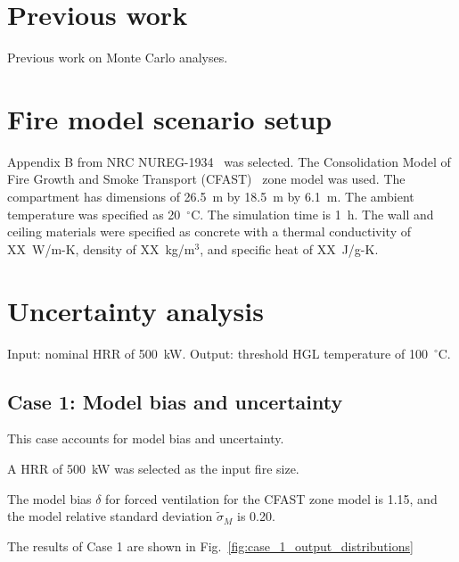\documentclass[12pt]{article}
\begin{document}
\section{Previous work}
\label{sec:previous_work}

Previous work on Monte Carlo analyses.


\section{Fire model scenario setup}
\label{sec:fire_model_scenario_setup}

Appendix B from NRC NUREG-1934~\cite{NUREG_1934} was selected. The Consolidation Model of Fire Growth and Smoke Transport (CFAST)~\cite{CFAST_Users_Guide_6} zone model was used. The compartment has dimensions of 26.5~m by 18.5~m by 6.1~m. The ambient temperature was specified as 20~$^\circ$C. The simulation time is 1~h. The wall and ceiling materials were specified as concrete with a thermal conductivity of XX~W/m-K, density of XX~kg/m$^3$, and specific heat of XX~J/g-K.


\section{Uncertainty analysis}
\label{sec:uncertainty_analysis}

Input: nominal HRR of 500~kW.
Output: threshold HGL temperature of 100~$^\circ$C.

\subsection{Case 1: Model bias and uncertainty}

This case accounts for model bias and uncertainty.

A HRR of 500~kW was selected as the input fire size.

The model bias $\delta$ for forced ventilation for the CFAST zone model is 1.15, and the model relative standard deviation $\widetilde\sigma_M$ is 0.20.

The results of Case 1 are shown in Fig.~\ref{fig:case_1_output_distributions}
\end{document}
